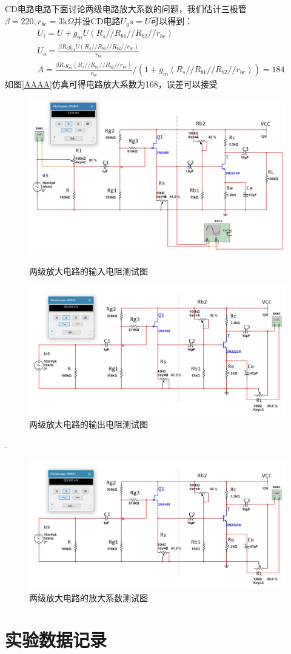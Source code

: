 \documentclass[UTF8,a4paper]{ctexart}
\begin{document}
CD电路电路下面讨论两级电路放大系数的问题，我们估计三极管$\beta=220,r_{be}=3\mathrm{k}\Omega$并设CD电路$U_gs=U$可以得到：
\begin{equation}\begin{aligned}
&U_i=U+g_mU(R_s//R_{b1}//R_{b2}//r_{be}) \\ 
&U_o=\frac{\beta R_cg_mU(R_s//R_{b1}//R_{b2}//r_{be})}{r_{be}}\\
&A=\frac{\beta R_cg_m(R_s//R_{b1}//R_{b2}//r_{be})}{r_{be}}/(1+g_m(R_s//R_{b1}//R_{b2}//r_{be}))=184
\end{aligned}\end{equation}
如图\ref{AAAA}仿真可得电路放大系数为168，误差可以接受
\begin{figure}
\centering
\includegraphics[width=\textwidth]{Ri2.jpg}
\caption{两级放大电路的输入电阻测试图}
\label{ri1}
\includegraphics [width=\textwidth]{Ro2.jpg}
\caption{两级放大电路的输出电阻测试图}
\label{ro2}
\end{figure}.
\begin{figure}
\includegraphics [width=\textwidth]{Ro2.jpg}
\caption{两级放大电路的放大系数测试图}
\label{ro2}
\end{figure}
\section{实验数据记录}
\end{document}
